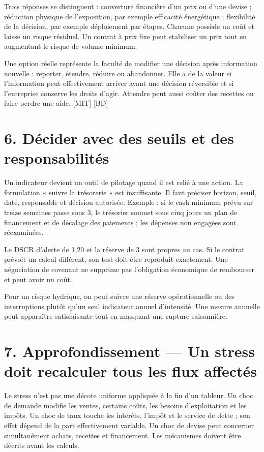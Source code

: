 \documentclass[12pt,a4paper]{article}
\begin{document}
Trois réponses se distinguent : couverture financière d’un prix ou d’une devise ; réduction physique de l’exposition, par exemple efficacité énergétique ; flexibilité de la décision, par exemple déploiement par étapes. Chacune possède un coût et laisse un risque résiduel. Un contrat à prix fixe peut stabiliser un prix tout en augmentant le risque de volume minimum.


Une option réelle représente la faculté de modifier une décision après information nouvelle : reporter, étendre, réduire ou abandonner. Elle a de la valeur si l’information peut effectivement arriver avant une décision réversible et si l’entreprise conserve les droits d’agir. Attendre peut aussi coûter des recettes ou faire perdre une aide. [MIT] [BD]

\section*{6. Décider avec des seuils et des responsabilités}
Un indicateur devient un outil de pilotage quand il est relié à une action. La formulation « suivre la trésorerie » est insuffisante. Il faut préciser horizon, seuil, date, responsable et décision autorisée. Exemple : si le cash minimum prévu sur treize semaines passe sous 3, le trésorier soumet sous cinq jours un plan de financement et de décalage des paiements ; les dépenses non engagées sont réexaminées.


Le DSCR d’alerte de 1,20 et la réserve de 3 sont propres au cas. Si le contrat prévoit un calcul différent, son test doit être reproduit exactement. Une négociation de covenant ne supprime pas l’obligation économique de rembourser et peut avoir un coût.


Pour un risque hydrique, on peut suivre une réserve opérationnelle ou des interruptions plutôt qu’un seul indicateur annuel d’intensité. Une mesure annuelle peut apparaître satisfaisante tout en masquant une rupture saisonnière.

\section*{7. Approfondissement --- Un stress doit recalculer tous les flux affectés}
Le stress n’est pas une décote uniforme appliquée à la fin d’un tableur. Un choc de demande modifie les ventes, certains coûts, les besoins d’exploitation et les impôts. Un choc de taux touche les intérêts, l’impôt et le service de dette ; son effet dépend de la part effectivement variable. Un choc de devise peut concerner simultanément achats, recettes et financement. Les mécanismes doivent être décrits avant les calculs.
\end{document}
